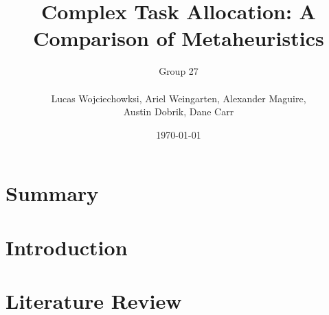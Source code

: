 \documentclass[a4paper]{article}
\title{Complex Task Allocation: A Comparison of Metaheuristics}
\author{
	Group 27 \\
	\\
	Lucas Wojciechowksi, Ariel Weingarten, Alexander Maguire, \\
	Austin Dobrik, Dane Carr}
\date{\today}
\begin{document}
\maketitle

\section*{Summary}


\section{Introduction}



\section{Literature Review}




%
\end{document}
